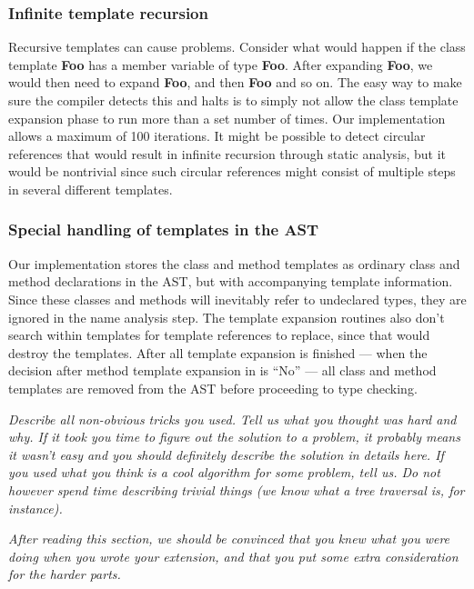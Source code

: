 \subsubsection{Infinite template recursion}

Recursive templates can cause problems. Consider what would happen if the class template
\textbf{Foo} has a member variable of type \textbf{Foo}. After expanding
\textbf{Foo}, we would then need to expand \textbf{Foo}, and then
\textbf{Foo} and so on. The easy way to make sure the compiler detects this and
halts is to simply not allow the class template expansion phase to run more than a set number of
times. Our implementation allows a maximum of 100 iterations. It might be possible to detect
circular references that would result in infinite recursion through static analysis, but it would be
nontrivial since such circular references might consist of multiple steps in several different
templates.

\subsubsection{Special handling of templates in the AST}

Our implementation stores the class and method templates as ordinary class and method declarations
in the AST, but with accompanying template information. Since these classes and methods will
inevitably refer to undeclared types, they are ignored in the name analysis step. The template
expansion routines also don't search within templates for template references to replace, since that
would destroy the templates. After all template expansion is finished --- when the decision after
method template expansion in  is ``No'' --- all class and method
templates are removed from the AST before proceeding to type checking.


\emph{Describe all non-obvious tricks you used. Tell us what you thought was hard and
why. If it took you time to figure out the solution to a problem, it probably
means it wasn't easy and you should definitely describe the solution in details
here. If you used what you think is a cool algorithm for some problem, tell us.
Do not however spend time describing trivial things (we know what a tree traversal
is, for instance).}

\emph{After reading this section, we should be convinced that you knew what you were
doing when you wrote your extension, and that you put some extra consideration
for the harder parts.}
